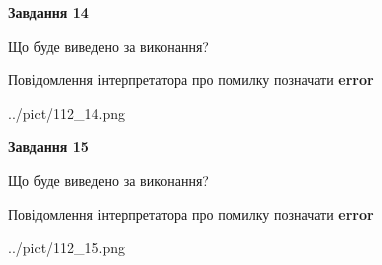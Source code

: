 \documentclass[11pt, ukrainian]{article}
\begin{document}
{\begin {large}
{\begin {center}\textbf{Завдання 14}\end {center}}\par
Що буде виведено за виконання? \par
Повідомлення інтерпретатора про помилку позначати \textbf{error}

\begin{center}
	{../pict/112_14.png}
\end{center}
\newpage

{\begin {center}\textbf{Завдання 15}\end {center}}\par
Що буде виведено за виконання? \par
Повідомлення інтерпретатора про помилку позначати \textbf{error}

\begin{center}
	{../pict/112_15.png}
\end{center}
\newpage

\end {large}}
\end{document}
